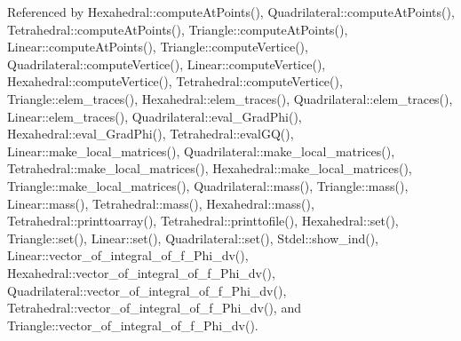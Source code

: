 Referenced by Hexahedral\+::compute\+At\+Points(), Quadrilateral\+::compute\+At\+Points(), Tetrahedral\+::compute\+At\+Points(), Triangle\+::compute\+At\+Points(), Linear\+::compute\+At\+Points(), Triangle\+::compute\+Vertice(), Quadrilateral\+::compute\+Vertice(), Linear\+::compute\+Vertice(), Hexahedral\+::compute\+Vertice(), Tetrahedral\+::compute\+Vertice(), Triangle\+::elem\+\_\+traces(), Hexahedral\+::elem\+\_\+traces(), Quadrilateral\+::elem\+\_\+traces(), Linear\+::elem\+\_\+traces(), Quadrilateral\+::eval\+\_\+\+Grad\+Phi(), Hexahedral\+::eval\+\_\+\+Grad\+Phi(), Tetrahedral\+::eval\+G\+Q(), Linear\+::make\+\_\+local\+\_\+matrices(), Quadrilateral\+::make\+\_\+local\+\_\+matrices(), Tetrahedral\+::make\+\_\+local\+\_\+matrices(), Hexahedral\+::make\+\_\+local\+\_\+matrices(), Triangle\+::make\+\_\+local\+\_\+matrices(), Quadrilateral\+::mass(), Triangle\+::mass(), Linear\+::mass(), Tetrahedral\+::mass(), Hexahedral\+::mass(), Tetrahedral\+::printtoarray(), Tetrahedral\+::printtofile(), Hexahedral\+::set(), Triangle\+::set(), Linear\+::set(), Quadrilateral\+::set(), Stdel\+::show\+\_\+ind(), Linear\+::vector\+\_\+of\+\_\+integral\+\_\+of\+\_\+f\+\_\+\+Phi\+\_\+dv(), Hexahedral\+::vector\+\_\+of\+\_\+integral\+\_\+of\+\_\+f\+\_\+\+Phi\+\_\+dv(), Quadrilateral\+::vector\+\_\+of\+\_\+integral\+\_\+of\+\_\+f\+\_\+\+Phi\+\_\+dv(), Tetrahedral\+::vector\+\_\+of\+\_\+integral\+\_\+of\+\_\+f\+\_\+\+Phi\+\_\+dv(), and Triangle\+::vector\+\_\+of\+\_\+integral\+\_\+of\+\_\+f\+\_\+\+Phi\+\_\+dv().

